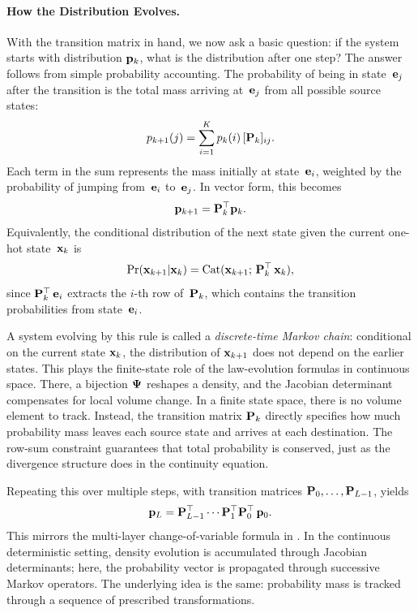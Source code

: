 \paragraph{How the Distribution Evolves.}
With the transition matrix in hand, we now ask a basic question: if the
system starts with distribution ${\mathbf{p}}_k$, what is the distribution after
one step? The answer follows from simple probability accounting. The
probability of being in state~${\mathbf{e}}_j$ after the transition is the total
mass arriving at~${\mathbf{e}}_j$ from all possible source states:
\begin{equation}
p_{k+1}(j) = \sum_{i=1}^K p_k(i)\,[{\mathbf{P}}_k]_{ij}.
\label{eq:discrete-transport-one-step}
\end{equation}
Each term in the sum represents the mass initially at state~${\mathbf{e}}_i$,
weighted by the probability of jumping from~${\mathbf{e}}_i$ to~${\mathbf{e}}_j$.
In vector form, this becomes
\[
{\mathbf{p}}_{k+1} = {\mathbf{P}}_k^\top {\mathbf{p}}_k.
\]
Equivalently, the conditional distribution of the next state given the
current one-hot state~${\mathbf{x}}_k$ is
\[
\Pr({\mathbf{x}}_{k+1} | {\mathbf{x}}_k)
= \mathrm{Cat}({\mathbf{x}}_{k+1};\,{\mathbf{P}}_k^\top\,{\mathbf{x}}_k),
\]
since ${\mathbf{P}}_k^\top\,{\mathbf{e}}_i$ extracts the $i$-th row of~${\mathbf{P}}_k$, which
contains the transition probabilities from state~${\mathbf{e}}_i$.

A system evolving by this rule is called a \emph{discrete-time Markov
chain}: conditional on the current state ${\mathbf{x}}_k$, the distribution of
${\mathbf{x}}_{k+1}$ does not depend on the earlier states. This plays the finite-state
role of the law-evolution formulas in continuous space. There, a bijection ${\bm{\Psi}}$ reshapes a density, and the
Jacobian determinant compensates for local volume change. In a finite
state space, there is no volume element to track. Instead, the transition
matrix ${\mathbf{P}}_k$ directly specifies how much probability mass leaves each
source state and arrives at each destination. The row-sum constraint
guarantees that total probability is conserved, just as the divergence
structure does in the continuity equation.

Repeating this over multiple steps, with transition matrices
${\mathbf{P}}_0, \dots, {\mathbf{P}}_{L-1}$, yields
\begin{equation*}
{\mathbf{p}}_L = {\mathbf{P}}_{L-1}^\top \cdots {\mathbf{P}}_1^\top {\mathbf{P}}_0^\top\, {\mathbf{p}}_0.
\end{equation*}
This mirrors the multi-layer change-of-variable formula in
. In the continuous deterministic setting, density
evolution is accumulated through Jacobian determinants; here, the
probability vector is propagated through successive Markov operators.
The underlying idea is the same: probability mass is tracked through a
sequence of prescribed transformations.

